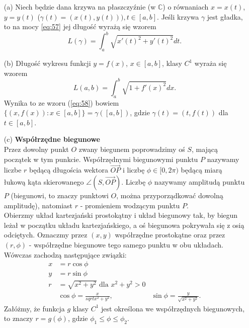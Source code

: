 \documentclass[leqno]{article}
\begin{document}
\begin{justify}
\begin{uwaga}
    \begin{itemize}
        \item [(a)] 
            Niech będzie dana krzywa na płaszczyźnie (w $\mathbb{C}$) o równaniach
            $x = x(t)$, $y = y(t)$ ($\gamma(t) = (x(t), y(t))), t \in [a,b]$. Jeśli krzywa $\gamma$ jest gładka, to na mocy
            \ref{eq:57} jej długość wyrażą się wzorem
            \begin{equation}\label{eq:58}
                L(\gamma) = \int_{a}^{b}\sqrt{x'(t)^2 + y'(t)^2}dt.
            \end{equation}
        \item [(b)] 
            Długość wykresu funkcji $y = f(x)$, $x \in [a,b]$, klasy $C^1$ wyraża się wzorem
            \[
                L(a,b) = \int_{a}^{b}\sqrt{1 + f'(x)^2}dx.
            \]
            Wynika to ze wzoru (\ref{eq:58}) bowiem $\{(x, f(x)) : x \in [a,b]\} = \gamma([a,b])$, gdzie
            $\gamma(t)=(t, f(t))$ dla $t \in [a,b]$. 
        \item [(c)]
            \textbf{Współrzędne biegunowe} \\
            Przez dowolny punkt $O$ zwany biegunem poprowadzimy oś $S$, mającą początek w tym punkcie.
            Współrzędnymi biegunowymi punktu $P$ nazywamy liczbe $r$ będącą długościa wektora $\overrightarrow{OP}$ i liczbę
            $\phi \in [0, 2\pi)$ będącą miarą łukową kąta skierowanego $\angle{(S, \overrightarrow{OP})}$. Liczbę $\phi$ nazywamy amplitudą
            punktu $P$ (biegunowi, to znaczy punktowi $O$, można przyporządkować dowolną amplitudę), natomiast $r$ - promieniem wodzącym punktu $P$. \\
            Obierzmy układ kartezjański prostokątny i układ biegunowy tak, by biegun leżał w początku układu kartezjańskiego, a oś biegunowa pokrywała się z osią odciętych.
            Oznaczmy przez $(x, y)$ współrzędne prostokątne oraz przez $(r, \phi)$ - współrzędne biegunowe tego samego punktu w obu układach. Wówczas zachodzą następujące związki:
            \begin{align*}
                x &= r\cos \phi \\
                y &= r \sin \phi \\
                r &= \sqrt{x^2+y^2} \text{ dla } x^2 + y^2 > 0 \\
                & \cos \phi = \frac{x}{sqrt{x^2+y^2}}, & \sin \phi = \frac{y}{\sqrt{x^2+y^2}}.
            \end{align*}
            Załóżmy, że funkcja $g$ klasy $C^1$ jest określona we współrzędnych biegunowych, to znaczy $r = g(\phi)$, gdzie $\phi_1 \leqslant \phi \leqslant \phi_2$. 

\end{itemize}
\end{uwaga}
\end{justify}
\end{document}
